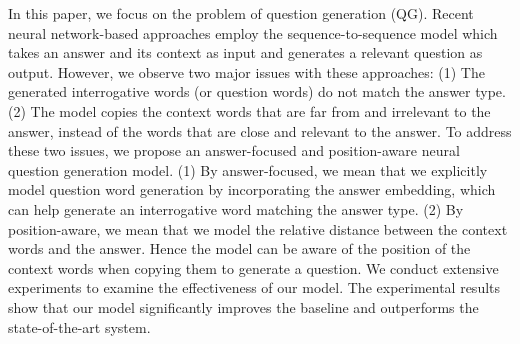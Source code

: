 In this paper, we focus on the problem of question generation (QG). Recent neural network-based approaches employ the sequence-to-sequence model which takes an answer and its context as input and generates a relevant question as output. However, we observe two major issues with these approaches: (1) The generated interrogative words (or question words) do not match the answer type. (2) The model copies the context words that are far from and irrelevant to the answer, instead of the words that are close and relevant to the answer. To address these two issues, we propose an answer-focused and position-aware neural question generation model. (1) By answer-focused, we mean that we explicitly model question word generation by incorporating the answer embedding, which can help generate an interrogative word matching the answer type. (2) By position-aware, we mean that we model the relative distance between the context words and the answer. Hence the model can be aware of the position of the context words when copying them to generate a question. We conduct extensive experiments to examine the effectiveness of our model. The experimental results show that our model significantly improves the baseline and outperforms the state-of-the-art system.
